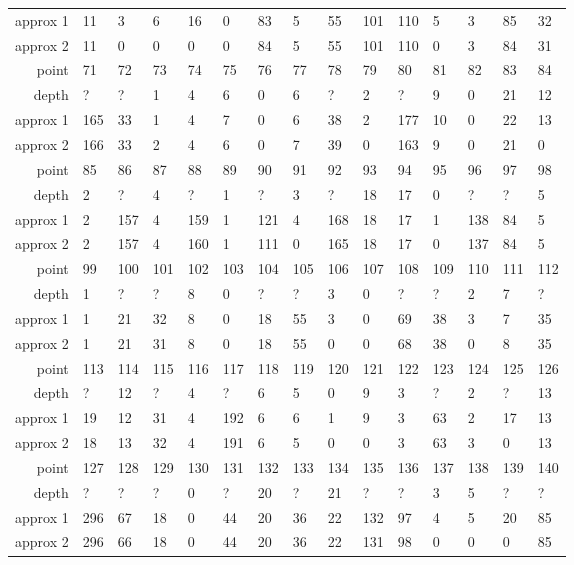 \begin{center}
\begin{supertabular}{|r|l l l l l l l l l l l l l l|}
approx 1 & 11 & 3 & 6 & 16 & 0 & 83 & 5 & 55 & 101 & 110 & 5 & 3 & 85 & 32 \\
approx 2 & 11 & 0 & 0 & 0 & 0 & 84 & 5 & 55 & 101 & 110 & 0 & 3 & 84 & 31 \\
\hline
point & 71 & 72 & 73 & 74 & 75 & 76 & 77 & 78 & 79 & 80 & 81 & 82 & 83 & 84 \\
\hline
depth & ? & ? & 1 & 4 & 6 & 0 & 6 & ? & 2 & ? & 9 & 0 & 21 & 12 \\
approx 1 & 165 & 33 & 1 & 4 & 7 & 0 & 6 & 38 & 2 & 177 & 10 & 0 & 22 & 13 \\
approx 2 & 166 & 33 & 2 & 4 & 6 & 0 & 7 & 39 & 0 & 163 & 9 & 0 & 21 & 0 \\
\hline
point & 85 & 86 & 87 & 88 & 89 & 90 & 91 & 92 & 93 & 94 & 95 & 96 & 97 & 98 \\
\hline
depth & 2 & ? & 4 & ? & 1 & ? & 3 & ? & 18 & 17 & 0 & ? & ? & 5 \\
approx 1 & 2 & 157 & 4 & 159 & 1 & 121 & 4 & 168 & 18 & 17 & 1 & 138 & 84 & 5 \\
approx 2 & 2 & 157 & 4 & 160 & 1 & 111 & 0 & 165 & 18 & 17 & 0 & 137 & 84 & 5 \\
\hline
point & 99 & 100 & 101 & 102 & 103 & 104 & 105 & 106 & 107 & 108 & 109 & 110 & 111 & 112 \\
\hline
depth & 1 & ? & ? & 8 & 0 & ? & ? & 3 & 0 & ? & ? & 2 & 7 & ? \\
approx 1 & 1 & 21 & 32 & 8 & 0 & 18 & 55 & 3 & 0 & 69 & 38 & 3 & 7 & 35 \\
approx 2 & 1 & 21 & 31 & 8 & 0 & 18 & 55 & 0 & 0 & 68 & 38 & 0 & 8 & 35 \\
\hline
point & 113 & 114 & 115 & 116 & 117 & 118 & 119 & 120 & 121 & 122 & 123 & 124 & 125 & 126 \\
\hline
depth & ? & 12 & ? & 4 & ? & 6 & 5 & 0 & 9 & 3 & ? & 2 & ? & 13 \\
approx 1 & 19 & 12 & 31 & 4 & 192 & 6 & 6 & 1 & 9 & 3 & 63 & 2 & 17 & 13 \\
approx 2 & 18 & 13 & 32 & 4 & 191 & 6 & 5 & 0 & 0 & 3 & 63 & 3 & 0 & 13 \\
\hline
point & 127 & 128 & 129 & 130 & 131 & 132 & 133 & 134 & 135 & 136 & 137 & 138 & 139 & 140 \\
\hline
depth & ? & ? & ? & 0 & ? & 20 & ? & 21 & ? & ? & 3 & 5 & ? & ? \\
approx 1 & 296 & 67 & 18 & 0 & 44 & 20 & 36 & 22 & 132 & 97 & 4 & 5 & 20 & 85 \\
approx 2 & 296 & 66 & 18 & 0 & 44 & 20 & 36 & 22 & 131 & 98 & 0 & 0 & 0 & 85 \\

\end{supertabular}
\end{center}
